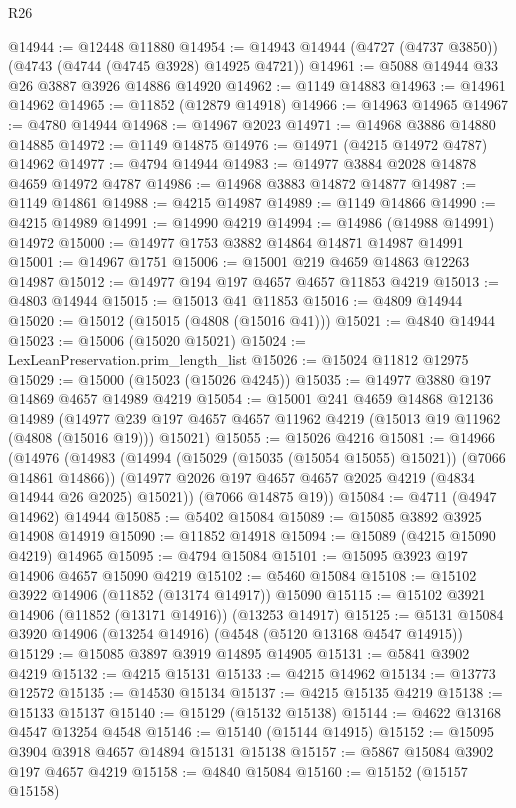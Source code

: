 \begin{lexlean}{R26}
\begin{coremodule}
@14944 := @12448 @11880
@14954 := @14943 @14944 (@4727 (@4737 @3850)) (@4743 (@4744 (@4745 @3928) @14925 @4721))
@14961 := @5088 @14944 @33 @26 @3887 @3926 @14886 @14920
@14962 := @1149 @14883
@14963 := @14961 @14962
@14965 := @11852 (@12879 @14918)
@14966 := @14963 @14965
@14967 := @4780 @14944
@14968 := @14967 @2023
@14971 := @14968 @3886 @14880 @14885
@14972 := @1149 @14875
@14976 := @14971 (@4215 @14972 @4787) @14962
@14977 := @4794 @14944
@14983 := @14977 @3884 @2028 @14878 @4659 @14972 @4787
@14986 := @14968 @3883 @14872 @14877
@14987 := @1149 @14861
@14988 := @4215 @14987
@14989 := @1149 @14866
@14990 := @4215 @14989
@14991 := @14990 @4219
@14994 := @14986 (@14988 @14991) @14972
@15000 := @14977 @1753 @3882 @14864 @14871 @14987 @14991
@15001 := @14967 @1751
@15006 := @15001 @219 @4659 @14863 @12263 @14987
@15012 := @14977 @194 @197 @4657 @4657 @11853 @4219
@15013 := @4803 @14944
@15015 := @15013 @41 @11853
@15016 := @4809 @14944
@15020 := @15012 (@15015 (@4808 (@15016 @41)))
@15021 := @4840 @14944
@15023 := @15006 (@15020 @15021)
@15024 := LexLeanPreservation.prim_length_list
@15026 := @15024 @11812 @12975
@15029 := @15000 (@15023 (@15026 @4245))
@15035 := @14977 @3880 @197 @14869 @4657 @14989 @4219
@15054 := @15001
    @241
    @4659
    @14868
    @12136
    @14989
    (@14977 @239 @197 @4657 @4657 @11962 @4219 (@15013 @19 @11962 (@4808 (@15016 @19))) @15021)
@15055 := @15026 @4216
@15081 := @14966
    (@14976
      (@14983
        (@14994 (@15029 (@15035 (@15054 @15055) @15021)) (@7066 @14861 @14866))
        (@14977 @2026 @197 @4657 @4657 @2025 @4219 (@4834 @14944 @26 @2025) @15021))
      (@7066 @14875 @19))
@15084 := @4711 (@4947 @14962) @14944
@15085 := @5402 @15084
@15089 := @15085 @3892 @3925 @14908 @14919
@15090 := @11852 @14918
@15094 := @15089 (@4215 @15090 @4219) @14965
@15095 := @4794 @15084
@15101 := @15095 @3923 @197 @14906 @4657 @15090 @4219
@15102 := @5460 @15084
@15108 := @15102 @3922 @14906 (@11852 (@13174 @14917)) @15090
@15115 := @15102 @3921 @14906 (@11852 (@13171 @14916)) (@13253 @14917)
@15125 := @5131 @15084 @3920 @14906 (@13254 @14916) (@4548 (@5120 @13168 @4547 @14915))
@15129 := @15085 @3897 @3919 @14895 @14905
@15131 := @5841 @3902 @4219
@15132 := @4215 @15131
@15133 := @4215 @14962
@15134 := @13773 @12572
@15135 := @14530 @15134
@15137 := @4215 @15135 @4219
@15138 := @15133 @15137
@15140 := @15129 (@15132 @15138)
@15144 := @4622 @13168 @4547 @13254 @4548
@15146 := @15140 (@15144 @14915)
@15152 := @15095 @3904 @3918 @4657 @14894 @15131 @15138
@15157 := @5867 @15084 @3902 @197 @4657 @4219
@15158 := @4840 @15084
@15160 := @15152 (@15157 @15158)

\end{coremodule}
\end{lexlean}
